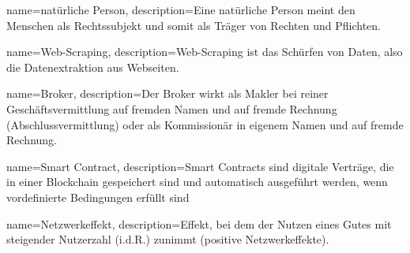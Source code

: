 {
name={natürliche Person},
description={\glqq Eine natürliche Person meint den Menschen als Rechtssubjekt und somit als Träger von Rechten und Pflichten.\grqq{} \cite{NatPerson_2018}}
}

{
name={Web-Scraping},
description={\glqq Web-Scraping ist das Schürfen von Daten, also die Datenextraktion aus Webseiten.\grqq{} \cite{webScraping_2021}}
}

{
name={Broker},
description={\glqq Der Broker wirkt als Makler bei reiner Geschäftsvermittlung auf fremden Namen und auf fremde Rechnung (Abschlussvermittlung) oder als Kommissionär in eigenem Namen und auf fremde Rechnung.\grqq{} \cite{broker_2018}}
}

{
name={Smart Contract},
description={\glqq Smart Contracts sind digitale Verträge, die in einer Blockchain gespeichert sind und automatisch ausgeführt werden, wenn vordefinierte Bedingungen erfüllt sind\grqq{} \cite{smartContract_2022}}
}

{
name={Netzwerkeffekt},
description={\glqq Effekt, bei dem der Nutzen eines Gutes mit steigender Nutzerzahl (i.d.R.) zunimmt (positive Netzwerkeffekte).\grqq{} \cite{Netzwerkeffekt_2018}}
}





